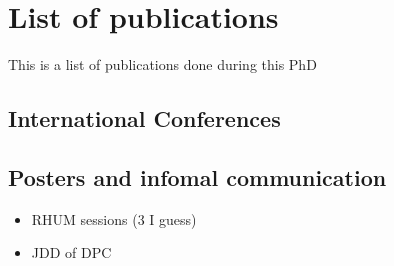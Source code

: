 \chapter{List of publications}
This is a list of publications done during this PhD

\section{International Conferences}

\section{Posters and infomal communication}
\begin{itemize}
  \item RHUM sessions (3 I guess)
  \item JDD of DPC
\end{itemize}
